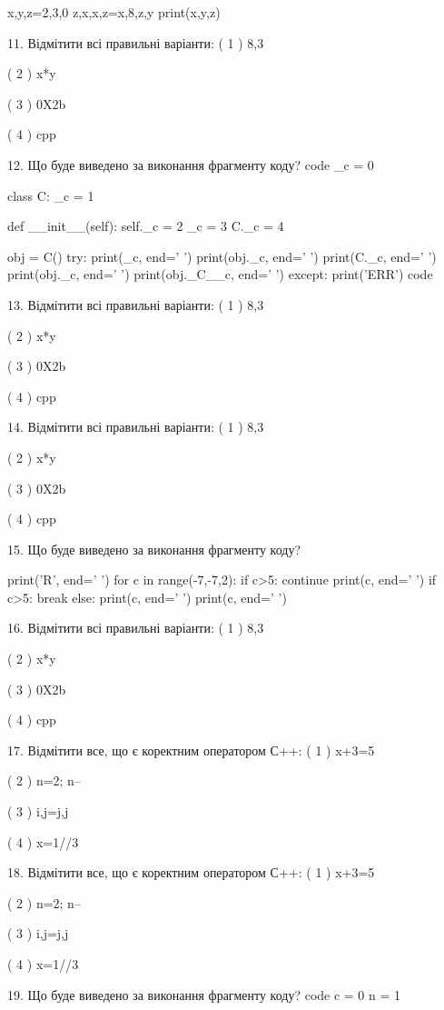 \documentclass[11pt]{article}
\begin{document}
x,y,z=2,3,0
z,x,x,z=x,8,z,y
print(x,y,z)

11. Відмітити всі правильні варіанти:
( 1 ) 8,3

( 2 ) x*y

( 3 ) 0X2b

( 4 ) cpp

12. Що буде виведено за виконання фрагменту коду?
code
_c = 0

class C:
    _c = 1
    
    def __init__(self):
        self._c = 2
        _c = 3
        C._c = 4

obj = C()
try:
    print(_c, end=' ')
    print(obj._c, end=' ')
    print(C._c, end=' ')
    print(obj._c, end=' ')
    print(obj._C__c, end=' ')
except:
    print('ERR')
code

13. Відмітити всі правильні варіанти:
( 1 ) 8,3

( 2 ) x*y

( 3 ) 0X2b

( 4 ) cpp

14. Відмітити всі правильні варіанти:
( 1 ) 8,3

( 2 ) x*y

( 3 ) 0X2b

( 4 ) cpp

15. Що буде виведено за виконання фрагменту коду?

print('R', end=' ')
for c in range(-7,-7,2):
    if c>5:
        continue
        print(c, end=' ')
    if c>5:
        break
    else:
        print(c, end=' ')
    print(c, end=' ')

16. Відмітити всі правильні варіанти:
( 1 ) 8,3

( 2 ) x*y

( 3 ) 0X2b

( 4 ) cpp

17. Відмітити все, що є коректним оператором С++:
( 1 ) x+3=5

( 2 ) n=2; n--

( 3 ) i,j=j,j

( 4 ) x=1//3

18. Відмітити все, що є коректним оператором С++:
( 1 ) x+3=5

( 2 ) n=2; n--

( 3 ) i,j=j,j

( 4 ) x=1//3

19. Що буде виведено за виконання фрагменту коду?
code
c = 0
n = 1
\end{document}
